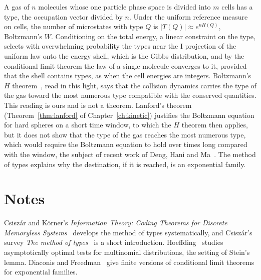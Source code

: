 A gas of $n$ molecules whose one particle phase space is divided into $m$ cells has a type, the occupation vector divided by $n$. Under the uniform reference measure on cells, the number of microstates with type $Q$ is $|T(Q)|\approx e^{nH(Q)}$, Boltzmann's $W$. Conditioning on the total energy, a linear constraint on the type, selects with overwhelming probability the types near the I projection of the uniform law onto the energy shell, which is the Gibbs distribution, and by the conditional limit theorem the law of a single molecule converges to it, provided that the shell contains types, as when the cell energies are integers. Boltzmann's $H$ theorem~\cite{boltzmann1872}, read in this light, says that the collision dynamics carries the type of the gas toward the most numerous type compatible with the conserved quantities. This reading is ours and is not a theorem. Lanford's theorem~\cite{lanford1975} (Theorem~\ref{thm:lanford} of Chapter~\ref{ch:kinetic}) justifies the Boltzmann equation for hard spheres on a short time window, to which the $H$ theorem then applies, but it does not show that the type of the gas reaches the most numerous type, which would require the Boltzmann equation to hold over times long compared with the window, the subject of recent work of Deng, Hani and Ma~\cite{denghanima2024}. The method of types explains why the destination, if it is reached, is an exponential family.

\section*{Notes}

Csisz\'ar and K\"orner's \emph{Information Theory: Coding Theorems for Discrete Memoryless Systems}~\cite{csiszarkorner2011} develops the method of types systematically, and Csisz\'ar's survey \emph{The method of types}~\cite{csiszar1998} is a short introduction. Hoeffding~\cite{hoeffding1965} studies asymptotically optimal tests for multinomial distributions, the setting of Stein's lemma. Diaconis and Freedman~\cite{diaconisfreedman1988} give finite versions of conditional limit theorems for exponential families.

